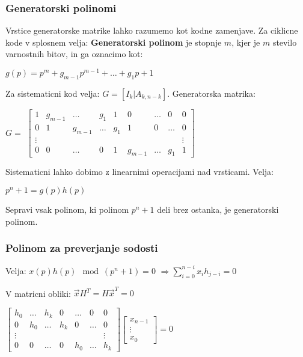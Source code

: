 \documentclass{article}
\begin{document}
\begin{multicols}{2}
	\subsubsection{Generatorski polinomi}
	Vrstice generatorske matrike lahko razumemo kot kodne zamenjave.
	Za ciklicne kode v splosnem velja: \textbf{Generatorski polinom} je stopnje $m$, kjer je $m$ stevilo
	varnostnih bitov, in ga oznacimo kot:
	\begin{center}
		\begin{math}
			g(p) = p^m + g_{m-1}p^{m-1} + \dots + g_1p + 1
		\end{math}
	\end{center}
	Za sistematicni kod velja: $G = [I_k | A_{k, n-k}]$.
	Generatorska matrika:
	\begin{center}
		$G= $
		\begin{math}
			\begin{bmatrix}
				1      & g_{m - 1} & \dots   & g_1   & 1   & 0       & \dots & 0     & 0      \\
				0      & 1         & g_{m-1} & \dots & g_1 & 1       & 0     & \dots & 0      \\
				\vdots &           &         &       &     &         &       &       & \vdots \\
				0      & 0         & \dots   & 0     & 1   & g_{m-1} & \dots & g_1   & 1
			\end{bmatrix}
		\end{math}
	\end{center}
	Sistematicni lahko dobimo z linearnimi operacijami nad vrsticami.
	Velja:
	\begin{center}
		\begin{math}
			p^n + 1 = g(p)h(p)
		\end{math}
	\end{center}
	Sepravi vsak polinom, ki polinom $p^n + 1$ deli brez ostanka, je generatorski polinom.

	\subsubsection{Polinom za preverjanje sodosti}
	Velja: $x(p)h(p) \mod(p^n + 1) = 0$ $\Rightarrow \sum_{i=0}^{n-i} x_i h_{j-i} = 0$

	V matricni obliki: $\vec{x} H^T = H\vec{x}^T = 0$
	\begin{center}
		\begin{math}
			\begin{bmatrix}
				h_0    & \dots & h_k   & 0   & \dots & 0     & 0      \\
				0      & h_0   & \dots & h_k & 0     & \dots & 0      \\
				\vdots &       &       &     &       &       & \vdots \\
				0      & 0     & \dots & 0   & h_0   & \dots & h_k
			\end{bmatrix}
			\begin{bmatrix}
				x_{n-1} \\
				\vdots  \\
				x_0
			\end{bmatrix} = 0
		\end{math}
	\end{center}


\end{multicols}
\end{document}
